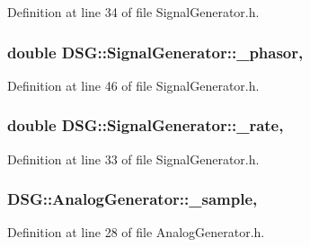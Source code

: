 Definition at line 34 of file Signal\+Generator.\+h.

\hypertarget{classDSG_1_1SignalGenerator_ac2271b582bf699275f077ecb642a8cd9}{
\subsubsection[{\+\_\+phasor}]{\setlength{\rightskip}{0pt plus 5cm}double D\+S\+G\+::\+Signal\+Generator\+::\+\_\+phasor\hspace{0.3cm}{\ttfamily [protected]}, {\ttfamily [inherited]}}}\label{classDSG_1_1SignalGenerator_ac2271b582bf699275f077ecb642a8cd9}


Definition at line 46 of file Signal\+Generator.\+h.

\hypertarget{classDSG_1_1SignalGenerator_aa10f6c85d9adee901139ea7fb346f39d}{
\subsubsection[{\+\_\+rate}]{\setlength{\rightskip}{0pt plus 5cm}double D\+S\+G\+::\+Signal\+Generator\+::\+\_\+rate\hspace{0.3cm}{\ttfamily [protected]}, {\ttfamily [inherited]}}}\label{classDSG_1_1SignalGenerator_aa10f6c85d9adee901139ea7fb346f39d}


Definition at line 33 of file Signal\+Generator.\+h.

\hypertarget{classDSG_1_1AnalogGenerator_ac88ad591cac37f636c2f7b460480bef9}{
\subsubsection[{\+\_\+sample}]{ D\+S\+G\+::\+Analog\+Generator\+::\+\_\+sample\hspace{0.3cm}{\ttfamily [protected]}, {\ttfamily [inherited]}}}\label{classDSG_1_1AnalogGenerator_ac88ad591cac37f636c2f7b460480bef9}


Definition at line 28 of file Analog\+Generator.\+h.



